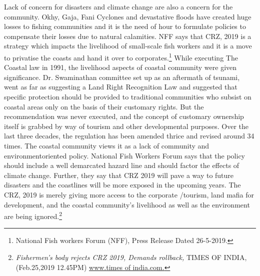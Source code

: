 \begin{multicols}{2}
\noi
Lack of concern for disasters and climate change are also a concern for the community.
Okhy, Gaja, Fani Cyclones and devastative floods have created huge losses to fishing
communities and it is the need of hour to formulate policies to compensate their losses due to
natural calamities. NFF says that CRZ, 2019 is a strategy which impacts the livelihood of
small-scale fish workers and it is a move to privatise the coasts and hand it over to
corporates.\footnote{National Fish workers Forum (NFF), Press Release Dated 26-5-2019.} While executing The Coastal law in 1991, the livelihood aspects of coastal
community were given significance. Dr. Swaminathan committee set up as an aftermath of
tsunami, went as far as suggesting a Land Right Recognition Law and suggested that specific
protection should be provided to traditional communities who subsist on coastal areas only on
the basis of their customary rights. But the recommendation was never executed, and the
concept of customary ownership itself is grabbed by way of tourism and other developmental
purposes. Over the last three decades, the regulation has been amended thrice and revised
around 34 times. The coastal community views it as a lack of community and environmentoriented policy. National Fish Workers Forum says that the policy should include a well
demarcated hazard line and should factor the effects of climate change. Further, they say that
CRZ 2019 will pave a way to future disasters and the coastlines will be more exposed in the
upcoming years. The CRZ, 2019 is merely giving more access to the corporate /tourism, land mafia for development, and the coastal community’s livelihood as well as the environment
are being ignored.\footnote{\textit{Fishermen’s body rejects CRZ 2019, Demands rollback,} TIMES OF INDIA,(Feb.25,2019 12.45PM) \url{www.times of india.com.}}


\end{multicols}

